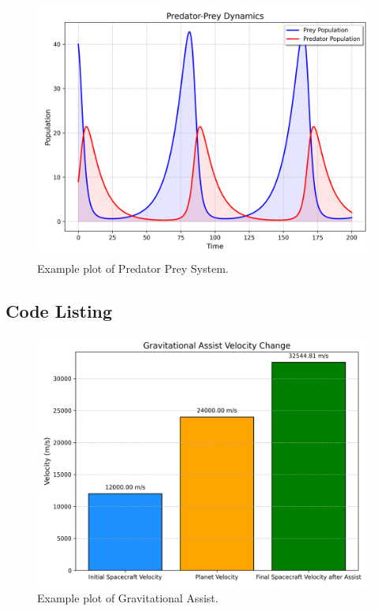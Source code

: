 \documentclass{report}%
\begin{document}
%
\newpage%
%
%


\begin{figure}[H]%
\centering%
\includegraphics[width=\textwidth]{plots/predator_prey_system_plot.png}%
\caption{Example plot of Predator Prey System.}%
\end{figure}

%
\clearpage%
\subsection{Code Listing}%
\label{subsec:CodeListing}%


%
\newpage%
%
%


\begin{figure}[H]%
\centering%
\includegraphics[width=\textwidth]{plots/gravitational_assist_plot.png}%
\caption{Example plot of Gravitational Assist.}%
\end{figure}
\end{document}
